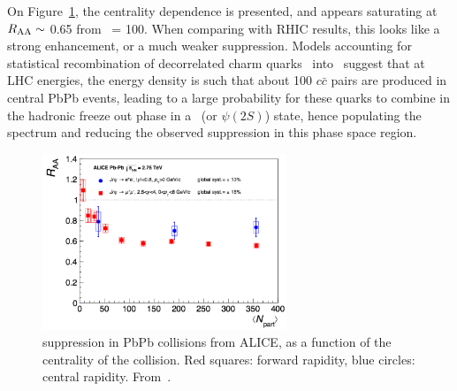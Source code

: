 On Figure~\ref{fig:alicenpart}, the
centrality dependence is presented, and appears saturating at $R_{\rm AA} \sim$ 0.65 from \Npart\ = 100. When comparing with RHIC results,
this looks like a strong enhancement, or a much weaker
suppression. Models accounting for statistical recombination of
decorrelated charm quarks~\cite{BraunMunzinger:2000px,Grandchamp:2002wp} into \Jpsi\ suggest that at LHC energies, the
energy density is such that about 100 $c\bar{c}$ pairs are produced in
central PbPb events, leading to a large probability for these quarks
to combine in the hadronic freeze out phase in a \Jpsi\ (or $\psi(2S)$)
state, hence populating the spectrum and reducing the observed
suppression in this phase space region.
\begin{figure}[h]
\begin{center}
  \includegraphics[width=0.65\textwidth]{Chapters/pQuarkonia/Aliceraanpartpsi.png}
  \caption{\Jpsi suppression in PbPb collisions from ALICE, as a function of
    the centrality of the collision. Red squares:
    forward rapidity, blue circles: central rapidity. From~\cite{jpsiALICE}.}
  \label{fig:alicenpart}
\end{center}
\end{figure}



